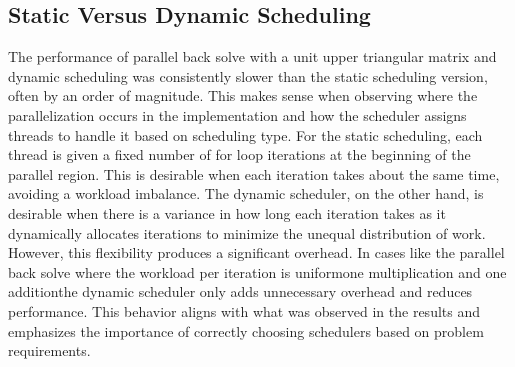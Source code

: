 \documentclass{article}
\begin{document}
\begin{table}[ht!]
    \caption{Parallel Back Solve with Dynamic Scheduling Timings (Seconds) on NOTS}
    \centering
\end{table}

\subsection{Static Versus Dynamic Scheduling}
The performance of parallel back solve with a unit upper triangular matrix and dynamic scheduling was consistently slower than the static scheduling version, often by an order of magnitude. This makes sense when observing where the parallelization occurs in the implementation and how the scheduler assigns threads to handle it based on scheduling type. For the static scheduling, each thread is given a fixed number of for loop iterations at the beginning of the parallel region. This is desirable when each iteration takes about the same time, avoiding a workload imbalance. The dynamic scheduler, on the other hand, is desirable when there is a variance in how long each iteration takes as it dynamically allocates iterations to minimize the unequal distribution of work. However, this flexibility produces a significant overhead. In cases like the parallel back solve where the workload per iteration is uniform\textemdash one multiplication and one addition\textemdash the dynamic scheduler only adds unnecessary overhead and reduces performance. This behavior aligns with what was observed in the results and emphasizes the importance of correctly choosing schedulers based on problem requirements.
\end{document}
